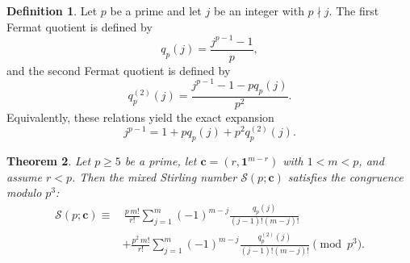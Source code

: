 \documentclass[12pt]{amsart}
\newtheorem{theorem}{Theorem}[section]
\theoremstyle{definition}
\newtheorem{definition}[theorem]{Definition}
\begin{document}
%

\begin{definition}
Let $p$ be a prime and let $j$ be an integer with $p \nmid j$. The first Fermat quotient is defined by
\[
q_p(j) = \frac{j^{p-1}-1}{p},
\]
and the second Fermat quotient is defined by
\[
q_p^{(2)}(j) = \frac{j^{p-1}-1-p q_p(j)}{p^2}.
\]
Equivalently, these relations yield the exact expansion
\[
j^{p-1} = 1 + p q_p(j) + p^2 q_p^{(2)}(j).
\]
\end{definition}

\begin{theorem}
\label{thm:p3_mixed_stirling}
Let $p \ge 5$ be a prime, let $\mathbf{c} = (r, \mathbf{1}^{m-r})$ with $1 < m < p$, and assume $r < p$. Then the mixed Stirling number $\mathcal{S}(p; \mathbf{c})$ satisfies the congruence modulo $p^3$:
\begin{align}
\mathcal{S}(p; \mathbf{c})
\equiv&\,
\frac{p \, m!}{r!}
\sum_{j=1}^{m}
(-1)^{m-j}
\frac{q_p(j)}{(j-1)!(m-j)!}
\nonumber\\
&+
\frac{p^2 \, m!}{r!}
\sum_{j=1}^{m}
(-1)^{m-j}
\frac{q_p^{(2)}(j)}{(j-1)!(m-j)!}
\pmod{p^3}.
\end{align}
\end{theorem}
\end{document}

